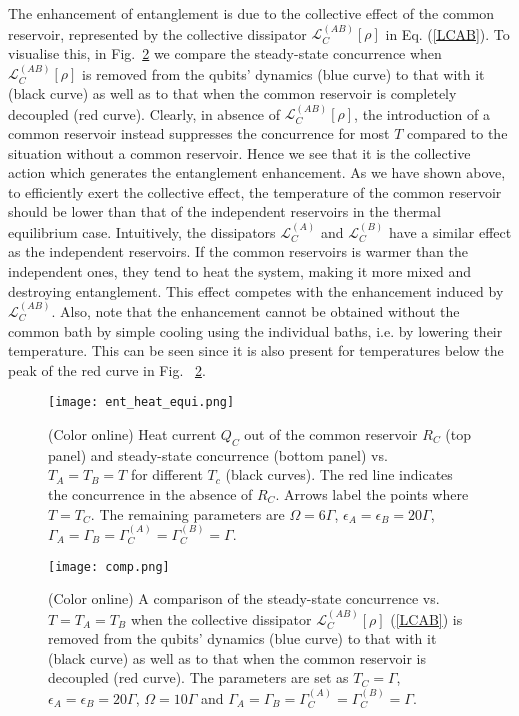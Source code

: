 \documentclass[12pt]{iopart}
\begin{document}
The enhancement of entanglement is due to the collective effect of the common reservoir, represented by the collective dissipator $\mathcal{L}_{C}^{(AB)}[\rho]$ in Eq. (\ref{LCAB}). To visualise this, in Fig.~\ref{comp} we compare the steady-state concurrence when $\mathcal{L}_{C}^{(AB)}[\rho]$ is removed from the qubits' dynamics (blue curve) to that with it (black curve) as well as to that when the common reservoir is completely decoupled (red curve). Clearly, in absence of $\mathcal{L}_{C}^{(AB)}[\rho]$, the introduction of a common reservoir instead suppresses the concurrence for most $T$ compared to the situation without a common reservoir. Hence we see that it is the collective action which generates the entanglement enhancement. As we have shown above, to efficiently exert the collective effect, the temperature of the common reservoir should be lower than that of the independent reservoirs in the thermal equilibrium case. Intuitively, the dissipators $\mathcal{L}_{C}^{(A)}$ and $\mathcal{L}_{C}^{(B)}$ have a similar effect as the independent reservoirs. If the common reservoirs is warmer than the independent ones, they tend to heat the system, making it more mixed and destroying entanglement. This effect competes with the enhancement induced by $\mathcal{L}_{C}^{(AB)}$. Also,
note that the enhancement cannot be obtained without the common bath by simple cooling using the individual baths, i.e. by lowering their temperature. This can be seen since it is also present for temperatures below the peak of the red curve in Fig. ~\ref{comp}.


\begin{figure}[tbp]
\begin{center}
{\texttt{[image: ent\_heat\_equi.png]} }
\end{center}
\caption{(Color online) Heat current $Q_{C}$ out of the common reservoir $R_{C}$ (top panel) and steady-state concurrence (bottom panel) vs.~$T_{A}=T_{B}=T$
for different $T_{c}$ (black curves). The red line indicates the concurrence in
the absence of $R_C$. Arrows label the points where $T=T_C$. The remaining parameters are $\Omega=6\Gamma$, $\epsilon_{A}=\epsilon_{B}=20\Gamma$, $\Gamma_{A}=\Gamma_{B}=\Gamma_{C}^{(A)}=\Gamma_{C}^{(B)}=\Gamma$.}
\label{ent-heat-equi}
\end{figure}

\begin{figure}[tbp]
\begin{center}
{\texttt{[image: comp.png]} }
\end{center}
\caption{(Color online) A comparison of the steady-state concurrence vs.~$T=T_{A}=T_{B}$ when the collective dissipator $\mathcal{L}_{C}^{(AB)}[\rho]$ (\ref{LCAB}) is removed from the qubits' dynamics (blue curve) to that with it (black curve) as well as to that when the common reservoir is decoupled (red curve).
The parameters are set as $T_{C}=\Gamma$, $\epsilon_{A}=\epsilon_{B}=20\Gamma$, $\Omega=10\Gamma$
and $\Gamma_{A}=\Gamma_{B}=\Gamma_{C}^{(A)}=\Gamma_{C}^{(B)}=\Gamma$.}
\label{comp}
\end{figure}
\end{document}

